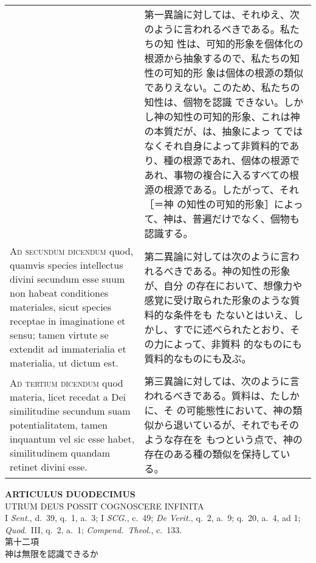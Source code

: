 \documentclass[10pt]{jsarticle} %
\begin{document}
\begin{longtable}{p{21em}p{21em}}
&

第一異論に対しては、それゆえ、次のように言われるべきである。私たちの知
性は、可知的形象を個体化の根源から抽象するので、私たちの知性の可知的形
象は個体の根源の類似でありえない。このため、私たちの知性は、個物を認識
できない。しかし神の知性の可知的形象、これは神の本質だが、は、抽象によっ
てではなくそれ自身によって非質料的であり、種の根源であれ、個体の根源で
あれ、事物の複合に入るすべての根源の根源である。したがって、それ［＝神
の知性の可知的形象］によって、神は、普遍だけでなく、個物も認識する。


\\


{\scshape Ad secundum dicendum} quod, quamvis species
intellectus divini secundum esse suum non habeat conditiones materiales,
sicut species receptae in imaginatione et sensu; tamen virtute se
extendit ad immaterialia et materialia, ut dictum est.


&

第二異論に対しては次のように言われるべきである。神の知性の形象が、自分
の存在において、想像力や感覚に受け取られた形象のような質料的な条件をも
たないとはいえ、しかし、すでに述べられたとおり、その力によって、非質料
的なものにも質料的なものにも及ぶ。


\\


{\scshape Ad tertium dicendum} quod materia, licet
recedat a Dei similitudine secundum suam potentialitatem, tamen
inquantum vel sic esse habet, similitudinem quandam retinet divini esse.


&

第三異論に対しては、次のように言われるべきである。質料は、たしかに、そ
の可能態性において、神の類似から退いているが、それでもそのような存在を
もつという点で、神の存在のある種の類似を保持している。




\end{longtable}
\newpage


\begin{center}
 {\Large {\bf ARTICULUS DUODECIMUS}}\\
 {\large UTRUM DEUS POSSIT COGNOSCERE INFINITA}\\
 {\footnotesize I {\itshape Sent.}, d.~39, q.~1, a.~3; I {\itshape SCG.}, c.~49; {\itshape De Verit.}, q.~2, a.~9; q.~20, a.~4, ad 1; {\itshape Quod}.~III, q.~2, a.~1; {\itshape Compend.~Theol.}, c.~133.}\\
 {\Large 第十二項\\神は無限を認識できるか}
\end{center}
\end{document}
